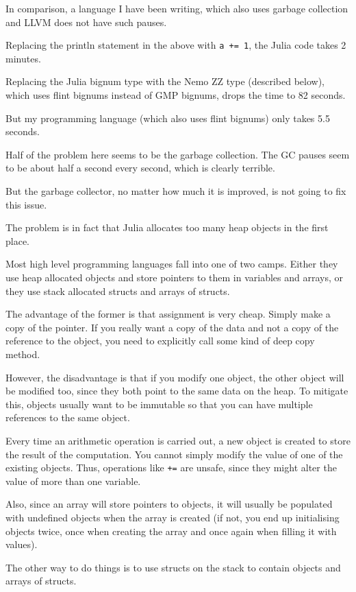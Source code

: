 \documentclass[a4paper,10pt]{article}
\newcommand{\code}{\lstinline}
\begin{document}
In comparison, a language I have been writing, which also uses garbage collection and LLVM does
not have such pauses. 

Replacing the println statement in the above with \code{a += 1}, the Julia code takes 2 minutes.

Replacing the Julia bignum type with the Nemo ZZ type (described below), which uses flint bignums
instead of GMP bignums, drops the time to 82 seconds.

But my programming language (which also uses flint bignums) only takes 5.5 seconds.

Half of the problem here seems to be the garbage collection. The GC pauses seem to be about half
a second every second, which is clearly terrible.

But the garbage collector, no matter how much it is improved, is not going to fix this issue.

The problem is in fact that Julia allocates too many heap objects in the first place.

Most high level programming languages fall into one of two camps. Either they use heap allocated
objects and store pointers to them in variables and arrays, or they use stack allocated structs
and arrays of structs.

The advantage of the former is that assignment is very cheap. Simply make a copy of the pointer.
If you really want a copy of the data and not a copy of the reference to the object, you need
to explicitly call some kind of deep copy method.

However, the disadvantage is that if you modify one object, the other object will be modified too,
since they both point to the same data on the heap. To mitigate this, objects usually want to be
immutable so that you can have multiple references to the same object.

Every time an arithmetic operation is carried out, a new object is created to store the result
of the computation. You cannot simply modify the value of one of the existing objects. Thus,
operations like \code{+=} are unsafe, since they might alter the value of more than one variable.

Also, since an array will store pointers to objects, it will usually be populated with undefined
objects when the array is created (if not, you end up initialising objects twice, once when
creating the array and once again when filling it with values).

The other way to do things is to use structs on the stack to contain objects and arrays of structs.
\end{document}
